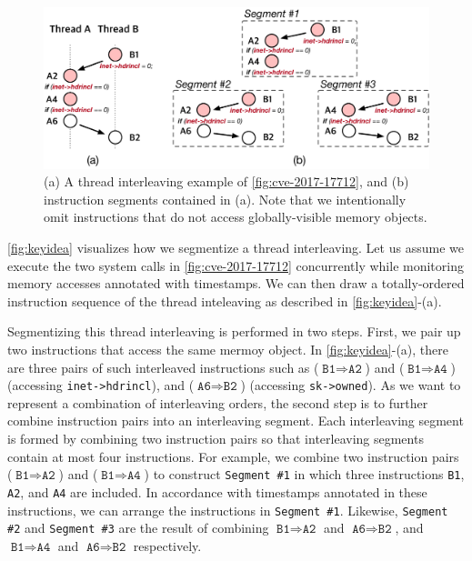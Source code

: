 %
\begin{figure}[t]
  \centering
  \includegraphics[width=0.99\linewidth]{fig/intuition.pdf}
  \caption{(a) A thread interleaving example of
    \autoref{fig:cve-2017-17712}, and (b) instruction segments
    contained in (a).  Note that we intentionally omit instructions
    that do not access globally-visible memory objects.}
  \label{fig:keyidea}
\end{figure}
%
\autoref{fig:keyidea} visualizes how we segmentize a thread
interleaving.
%
Let us assume we execute the two system calls in
\autoref{fig:cve-2017-17712} concurrently while monitoring memory
accesses annotated with timestamps.
%
We can then draw a totally-ordered instruction sequence of the thread
inteleaving as described in \autoref{fig:keyidea}-(a).



Segmentizing this thread interleaving is performed in two steps.
%
First, we pair up two instructions that access the same mermoy object.
%
In \autoref{fig:keyidea}-(a), there are three pairs of such
interleaved instructions such as
($\texttt{B1} \Rightarrow \texttt{A2}$) and
($\texttt{B1} \Rightarrow \texttt{A4}$) (accessing
\texttt{inet->hdrincl}), and ($\texttt{A6} \Rightarrow \texttt{B2}$)
(accessing \texttt{sk->owned}).
%
As we want to represent a combination of interleaving orders, the
second step is to further combine instruction pairs into an
interleaving segment.
%
Each interleaving segment is formed by combining two instruction pairs
so that interleaving segments contain at most four instructions.
%
For example, we combine two instruction pairs
($\texttt{B1} \Rightarrow \texttt{A2}$) and
($\texttt{B1} \Rightarrow \texttt{A4}$) to construct \texttt{Segment
  \#1} in which three instructions \texttt{B1}, \texttt{A2}, and
\texttt{A4} are included.
%
In accordance with timestamps annotated in these instructions, we can
arrange the instructions in \texttt{Segment \#1}.
%
Likewise, \texttt{Segment \#2} and \texttt{Segment \#3} are the result
of combining $\texttt{B1} \Rightarrow \texttt{A2}$ and
$\texttt{A6} \Rightarrow \texttt{B2}$, and
$\texttt{B1} \Rightarrow \texttt{A4}$ and
$\texttt{A6} \Rightarrow \texttt{B2}$ respectively.

